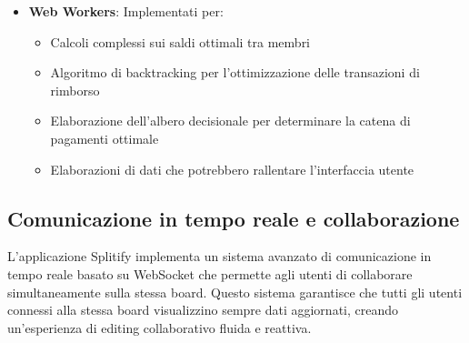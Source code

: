 \documentclass[11pt]{article}
\begin{document}
\begin{itemize}
    \item \textbf{Web Workers}: Implementati per:
    \begin{itemize}
        \item Calcoli complessi sui saldi ottimali tra membri
        \item Algoritmo di backtracking per l'ottimizzazione delle transazioni di rimborso
        \item Elaborazione dell'albero decisionale per determinare la catena di pagamenti ottimale
        \item Elaborazioni di dati che potrebbero rallentare l'interfaccia utente
    \end{itemize}
\end{itemize}

\subsection{Comunicazione in tempo reale e collaborazione}
L'applicazione Splitify implementa un sistema avanzato di comunicazione in tempo reale basato su WebSocket che permette agli utenti di collaborare simultaneamente sulla stessa board. Questo sistema garantisce che tutti gli utenti connessi alla stessa board visualizzino sempre dati aggiornati, creando un'esperienza di editing collaborativo fluida e reattiva.
\end{document}
